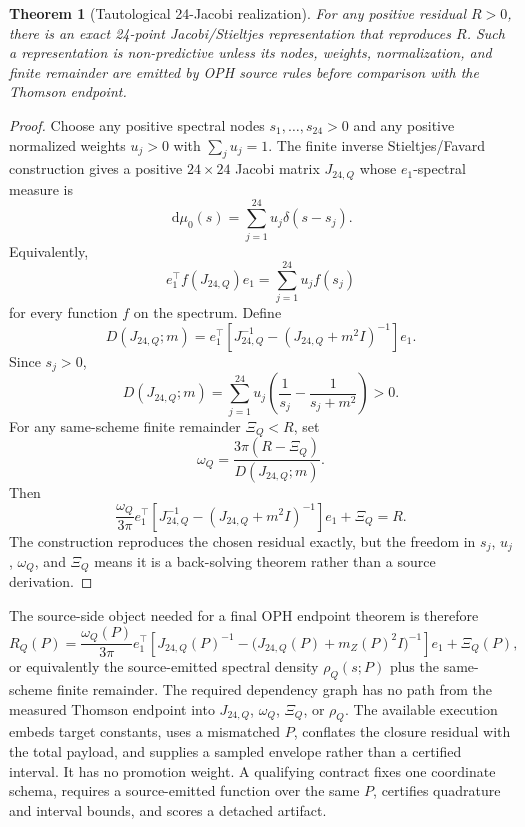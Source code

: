 \documentclass[11pt]{article}
\newtheorem{theorem}{Theorem}
\theoremstyle{remark}
\newcommand{\dd}{\,\mathrm d}
\newcommand{\Rq}{R_Q}
\begin{document}
\begin{theorem}[Tautological 24-Jacobi realization]
For any positive residual \(R>0\), there is an exact 24-point Jacobi/Stieltjes representation that
reproduces \(R\). Such a representation is non-predictive unless its nodes, weights,
normalization, and finite remainder are emitted by OPH source rules before comparison with the
Thomson endpoint.
\end{theorem}

\begin{proof}
Choose any positive spectral nodes \(s_1,\ldots,s_{24}>0\) and any positive normalized weights
\(u_j>0\) with \(\sum_j u_j=1\). The finite inverse Stieltjes/Favard construction gives a
positive \(24\times24\) Jacobi matrix \(J_{24,Q}\) whose \(e_1\)-spectral measure is
\[
\dd\mu_0(s)=\sum_{j=1}^{24}u_j\delta(s-s_j).
\]
Equivalently,
\[
e_1^\top f(J_{24,Q})e_1=\sum_{j=1}^{24}u_j f(s_j)
\]
for every function \(f\) on the spectrum. Define
\[
D(J_{24,Q};m)
=
e_1^\top\!\left[J_{24,Q}^{-1}-(J_{24,Q}+m^2I)^{-1}\right]e_1.
\]
Since \(s_j>0\),
\[
D(J_{24,Q};m)=
\sum_{j=1}^{24}u_j\left(\frac1{s_j}-\frac1{s_j+m^2}\right)>0.
\]
For any same-scheme finite remainder \(\Xi_Q<R\), set
\[
\omega_Q=\frac{3\pi(R-\Xi_Q)}{D(J_{24,Q};m)}.
\]
Then
\[
\frac{\omega_Q}{3\pi}
e_1^\top\!\left[J_{24,Q}^{-1}-(J_{24,Q}+m^2I)^{-1}\right]e_1
+\Xi_Q
=R.
\]
The construction reproduces the chosen residual exactly, but the freedom in \(s_j\), \(u_j\),
\(\omega_Q\), and \(\Xi_Q\) means it is a back-solving theorem rather than a source derivation.
\end{proof}

The source-side object needed for a final OPH endpoint theorem is therefore
\begin{equation}
\Rq(P)
=
\frac{\omega_Q(P)}{3\pi}
e_1^\top\!\left[
J_{24,Q}(P)^{-1}
-
\bigl(J_{24,Q}(P)+m_Z(P)^2I\bigr)^{-1}
\right]e_1
+\Xi_Q(P),
\label{eq:sourceJ24Q}
\end{equation}
or equivalently the source-emitted spectral density \(\rho_Q(s;P)\) plus the same-scheme finite
remainder. The required dependency graph has no path from the measured Thomson endpoint into
\(J_{24,Q}\), \(\omega_Q\), \(\Xi_Q\), or \(\rho_Q\). The available execution embeds target
constants, uses a mismatched \(P\), conflates the closure residual with the total payload, and
supplies a sampled envelope rather than a certified interval. It has no promotion weight.
A qualifying contract fixes one coordinate schema, requires a source-emitted function over the
same \(P\), certifies quadrature and interval bounds, and scores a detached artifact.
\end{document}
